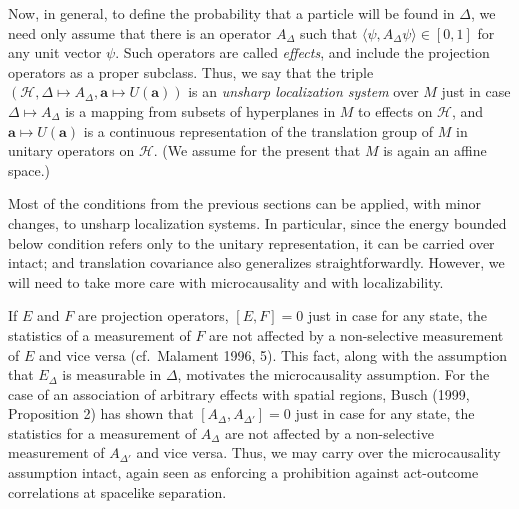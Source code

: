 \documentclass[11pt]{article}
\theoremstyle{remark}
\newcommand{\hil}[1]{\mathcal{#1}}
\begin{document}
Now, in general, to define the probability that a particle will be
found in $\Delta$, we need only assume that there is an operator
$A_{\Delta}$ such that $\langle \psi ,A_{\Delta}\psi \rangle \in
[0,1]$ for any unit vector $\psi$.  Such operators are called
\emph{effects}, and include the projection operators as a proper
subclass.  Thus, we say that the triple $(\hil{H},\Delta \mapsto
A_{\Delta},\mathbf{a}\mapsto U(\mathbf{a}))$ is an \emph{unsharp
  localization system} over $M$ just in case $\Delta \mapsto
A_{\Delta}$ is a mapping from subsets of hyperplanes in $M$ to effects
on $\hil{H}$, and $\mathbf{a}\mapsto U(\mathbf{a})$ is a continuous
representation of the translation group of $M$ in unitary operators on
$\hil{H}$.  (We assume for the present that $M$ is again an affine
space.)

Most of the conditions from the previous sections can be applied, with
minor changes, to unsharp localization systems.  In particular, since
the energy bounded below condition refers only to the unitary
representation, it can be carried over intact; and translation
covariance also generalizes straightforwardly.  However, we will need
to take more care with microcausality and with localizability.

If $E$ and $F$ are projection operators, $[E,F]=0$ just in case for
any state, the statistics of a measurement of $F$ are not affected by
a non-selective measurement of $E$ and vice versa (cf.~Malament 1996,
5).  This fact, along with the assumption that $E_{\Delta}$ is
measurable in $\Delta$, motivates the microcausality assumption.  For
the case of an association of arbitrary effects with spatial regions,
Busch (1999, Proposition 2) has shown that $[A_{\Delta},A_{\Delta
  '}]=0$ just in case for any state, the statistics for a measurement
of $A_{\Delta}$ are not affected by a non-selective measurement of
$A_{\Delta '}$ and vice versa.  Thus, we may carry over the
microcausality assumption intact, again seen as enforcing a
prohibition against act-outcome correlations at spacelike separation.
\end{document}
